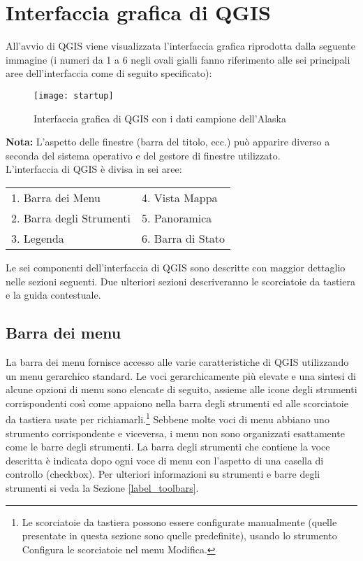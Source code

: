 \section{Interfaccia grafica di QGIS}
\label{label_qgismainwindow}

All'avvio di QGIS viene visualizzata l'interfaccia grafica riprodotta dalla seguente immagine  
(i numeri da 1 a 6 negli ovali gialli fanno riferimento alle sei principali aree dell'interfaccia 
come di seguito specificato):

\begin{figure}[ht]
   \centering
    \texttt{[image: startup]}
    \caption{Interfaccia grafica di QGIS con i dati campione dell'Alaska \nixcaption} \label{fig:startup}
\end{figure}

\textbf{Nota:} L'aspetto delle finestre (barra del titolo, ecc.) può apparire diverso a seconda 
del sistema operativo e del gestore di finestre utilizzato.\\

L'interfaccia di QGIS è divisa in sei aree:

\begin{tabular}{p{5cm} p{5cm}}
1. Barra dei Menu & 4. Vista Mappa \\
2. Barra degli Strumenti & 5. Panoramica \\
3. Legenda & 6. Barra di Stato \\
\end{tabular}

Le sei componenti dell'interfaccia di QGIS sono descritte con maggior dettaglio
nelle sezioni seguenti. Due ulteriori sezioni descriveranno le scorciatoie da 
tastiera e la guida contestuale.


\subsection{Barra dei menu}\label{label_menubar}

La barra dei menu fornisce accesso alle varie caratteristiche di QGIS utilizzando 
un menu gerarchico standard. Le voci gerarchicamente più elevate e una sintesi 
di alcune opzioni di menu sono elencate di seguito, assieme alle icone degli 
strumenti corrispondenti così come appaiono nella barra degli strumenti ed alle 
scorciatoie da tastiera usate per richiamarli.\footnote{Le scorciatoie da tastiera 
possono essere configurate manualmente (quelle presentate in questa sezione sono quelle predefinite), 
usando lo strumento Configura le scorciatoie nel menu Modifica.} Sebbene molte voci di menu abbiano 
uno strumento corrispondente e viceversa, i menu non sono organizzati esattamente come le barre degli strumenti.
La barra degli strumenti che contiene la voce descritta è indicata dopo ogni voce di 
menu con l'aspetto di una casella di controllo (checkbox). Per ulteriori informazioni su 
strumenti e barre degli strumenti si veda la Sezione \ref{label_toolbars}.

